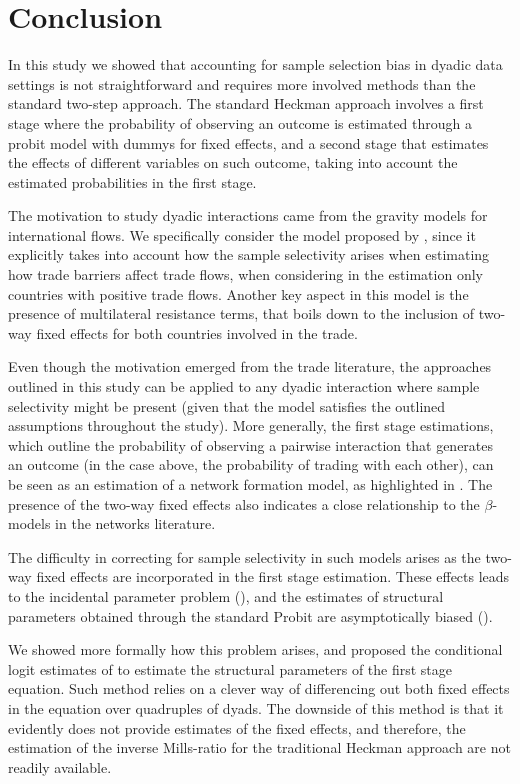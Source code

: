 \section{Conclusion} \label{conclusion}
In this study we showed that accounting for sample selection bias in dyadic data settings is not straightforward and requires more involved methods than the standard \cite{helpman2008estimating} two-step approach. The standard Heckman approach involves a first stage where the probability of observing an outcome is estimated through a probit model with dummys for fixed effects, and a second stage that estimates the effects of different variables on such outcome, taking into account the estimated probabilities in the first stage.

The motivation to study dyadic interactions came from the gravity models for international flows. We specifically consider the model proposed by \cite{helpman2008estimating}, since it explicitly takes into account how the sample selectivity arises when estimating how trade barriers affect trade flows, when considering in the estimation only countries with positive trade flows. Another key aspect in this model is the presence of multilateral resistance terms, that boils down to the inclusion of two-way fixed effects for both countries involved in the trade.

Even though the motivation emerged from the trade literature, the approaches outlined in this study can be applied to any dyadic interaction where sample selectivity might be present (given that the model satisfies the outlined assumptions throughout the study). More generally, the first stage estimations, which outline the probability of observing a pairwise interaction that generates an outcome (in the case above, the probability of trading with each other), can be seen as an estimation of a network formation model, as highlighted in \cite{jochmans2018semiparametric}. The presence of the two-way fixed effects also indicates a close relationship to the $\beta$-models in the networks literature.

The difficulty in correcting for sample selectivity in such models arises as the two-way fixed effects are incorporated in the first stage estimation. These effects leads to the incidental parameter problem (\cite{neyman1948consistent}), and the estimates of structural parameters obtained through the standard Probit are asymptotically biased (\cite{fernandez2016individual}).

We showed more formally how this problem arises, and proposed the conditional logit estimates of \cite{charbonneau2017multiple} to estimate the structural parameters of the first stage equation. Such method relies on a clever way of differencing out both fixed effects in the equation over quadruples of dyads. The downside of this method is that it evidently does not provide estimates of the fixed effects, and therefore, the estimation of the inverse Mills-ratio for the traditional Heckman approach are not readily available.

